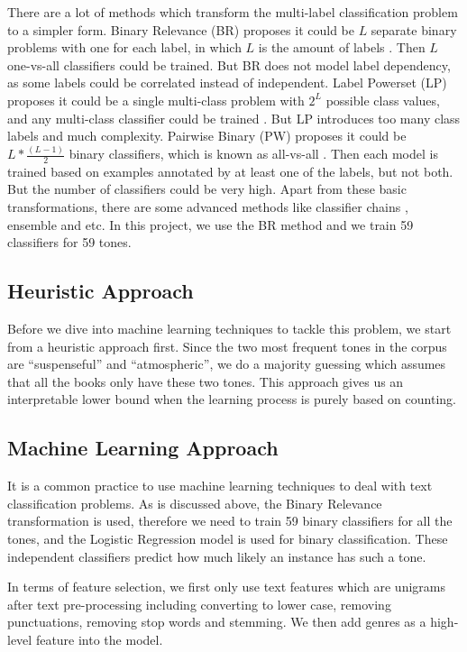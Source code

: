 \documentclass[runningheads]{llncs}
\begin{document}
There are a lot of methods which transform the multi-label classification problem to a simpler form. Binary Relevance (BR) proposes it could be $L$ separate binary problems with one for each label, in which $L$ is the amount of labels \cite{luaces2012binary}. Then $L$ one-vs-all classifiers could be trained. But BR does not model label dependency, as some labels could be correlated instead of independent. Label Powerset (LP) proposes it could be a single multi-class problem with $2^{L}$ possible class values, and any multi-class classifier could be trained \cite{tsoumakas2010random}. But LP introduces too many class labels and much complexity. Pairwise Binary (PW) proposes it could be $L* \frac{(L-1)}{2}$ binary classifiers, which is known as all-vs-all \cite{petrovskiy2006paired}. Then each model is trained based on examples annotated by at least one of the labels, but not both. But the number of classifiers could be very high. Apart from these basic transformations, there are some advanced methods like classifier chains \cite{read2009classifier}, ensemble \cite{read2008multi} and etc. In this project, we use the BR method and we train 59 classifiers for 59 tones.

\subsection{Heuristic Approach}
Before we dive into machine learning techniques to tackle this problem, we start from a heuristic approach first. Since the two most frequent tones in the corpus are ``suspenseful'' and ``atmospheric'', we do a majority guessing which assumes that all the books only have these two tones. This approach gives us an interpretable lower bound when the learning process is purely based on counting.

\subsection{Machine Learning Approach}
It is a common practice to use machine learning techniques to deal with text classification problems. As is discussed above, the Binary Relevance transformation is used, therefore we need to train 59 binary classifiers for all the tones, and the Logistic Regression model is used for binary classification. These independent classifiers predict how much likely an instance has such a tone.

In terms of feature selection, we first only use text features which are unigrams after text pre-processing including converting to lower case, removing punctuations, removing stop words and stemming. We then add genres as a high-level feature into the model.
\end{document}
